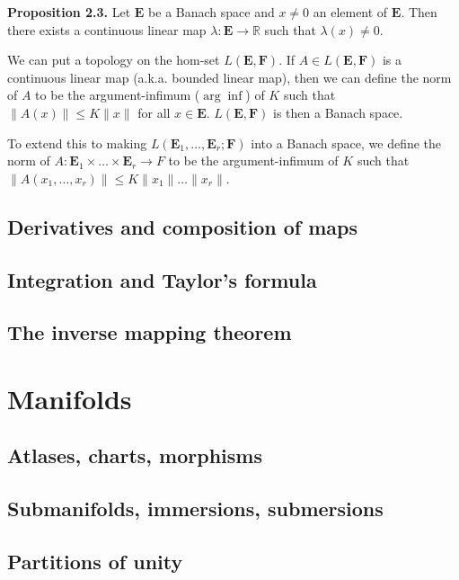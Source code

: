 \documentclass[a4paper]{article}
\newcommand{\R}{\mathbb{R}}
\begin{document}
\textbf{Proposition 2.3.} Let $\mathbf{E}$ be a Banach space and $x \neq 0$ an element of $\mathbf{E}$. Then there exists a continuous linear map $\lambda : \mathbf{E} \to \R$ such that $\lambda(x) \neq 0$.

We can put a topology on the hom-set $L(\mathbf{E}, \mathbf{F})$. If $A \in L(\mathbf{E}, \mathbf{F})$ is a continuous linear map (a.k.a. bounded linear map), then we can define the norm of $A$ to be the argument-infimum ($\arg\inf$) of $K$ such that $\|A(x)\| \leq K\|x\|$ for all $x \in \mathbf{E}$. $L(\mathbf{E}, \mathbf{F})$ is then a Banach space.

To extend this to making $L(\textbf{E}_1, \ldots, \textbf{E}_r; \textbf{F})$ into a Banach space, we define the norm of $A : \textbf{E}_1 \times \ldots \times \textbf{E}_r \to F$ to be the argument-infimum of $K$ such that $\|A(x_1, \ldots, x_r)\| \leq K\|x_1\| \ldots \|x_r\|$.

\subsection{Derivatives and composition of maps}

\subsection{Integration and Taylor's formula}

\subsection{The inverse mapping theorem}

\section{Manifolds}

\subsection{Atlases, charts, morphisms}

\subsection{Submanifolds, immersions, submersions}

\subsection{Partitions of unity}
\end{document}
